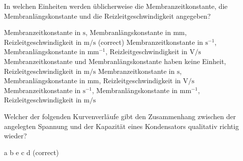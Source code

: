 \documentclass[11pt]{exam}
\begin{document}
\begin{questions}
\vspace{3mm}\question In welchen Einheiten werden üblicherweise die Membranzeitkonstante, die Membranlängskonstante und die Reizleitgeschwindigkeit angegeben?

\begin{choices}
	\choice Membranzeitkonstante in \(\mathrm{s}\), Membranlängskonstante in \(\mathrm{mm}\), Reizleitgeschwindigkeit in \(\mathrm{m/s}\) (correct)
	\choice Membranzeitkonstante in \(\mathrm{s^{-1}}\), Membranlängskonstante in \(\mathrm{mm^{-1}}\), Reizleitgeschwindigkeit in \(\mathrm{V/s}\)
	\choice Membranzeitkonstante und Membranlängskonstante haben keine Einheit, Reizleitgeschwindigkeit in \(\mathrm{m/s}\)
	\choice Membranzeitkonstante in \(\mathrm{s}\), Membranlängskonstante in \(\mathrm{mm}\), Reizleitgeschwindigkeit in \(\mathrm{V/s}\)
	\choice Membranzeitkonstante in \(\mathrm{s^{-1}}\), Membranlängskonstante in \(\mathrm{mm^{-1}}\), Reizleitgeschwindigkeit in \(\mathrm{m/s}\)
\end{choices}

\vspace{3mm}\question Welcher der folgenden Kurvenverläufe gibt den Zusammenhang zwischen der angelegten Spannung und der Kapazität eines Kondensators qualitativ richtig wieder?

\begin{choices}
	\choice a
	\choice b
	\choice e
	\choice c
	\choice d (correct)
\end{choices}

\vspace{3mm}\end{questions}
\end{document}
